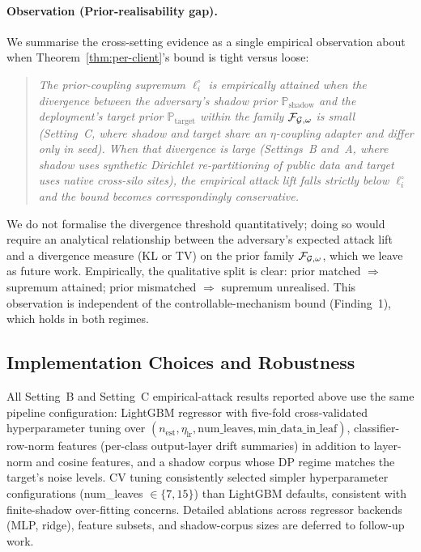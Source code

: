 \paragraph{Observation (Prior-realisability gap).}
We summarise the cross-setting evidence as a single empirical
observation about when Theorem~\ref{thm:per-client}'s bound is
tight versus loose:

\begin{quote}
\emph{The prior-coupling supremum $\ell_i^\circ$ is empirically
attained when the divergence between the adversary's shadow prior
$\mathbb{P}_{\mathrm{shadow}}$ and the deployment's target prior
$\mathbb{P}_{\mathrm{target}}$ within the family
$\mathcal{F}_{\mathcal{G},\omega}$ is small (Setting~C, where shadow and target
share an $\eta$-coupling adapter and differ only in seed). When that
divergence is large (Settings~B and~A, where shadow uses synthetic
Dirichlet re-partitioning of public data and target uses native
cross-silo sites), the empirical attack lift falls strictly below
$\ell_i^\circ$ and the bound becomes correspondingly conservative.}
\end{quote}

We do not formalise the divergence threshold quantitatively; doing so
would require an analytical relationship between the adversary's
expected attack lift and a divergence measure (KL or TV) on the
prior family $\mathcal{F}_{\mathcal{G},\omega}$, which we leave as future work.
Empirically, the qualitative split is clear: prior matched
$\Rightarrow$ supremum attained; prior mismatched
$\Rightarrow$ supremum unrealised. This observation is independent of
the controllable-mechanism bound (Finding~1), which holds in both
regimes.

\subsection{Implementation Choices and Robustness}
\label{sec:experiments-ablations}

All Setting~B and Setting~C empirical-attack results reported above
use the same \TADI pipeline configuration: LightGBM regressor with
five-fold cross-validated hyperparameter tuning over
$(n_{\text{est}}, \eta_{\text{lr}}, \text{num\_leaves}, \text{min\_data\_in\_leaf})$,
classifier-row-norm features (per-class output-layer drift summaries)
in addition to layer-norm and cosine features, and a shadow corpus
whose DP regime matches the target's noise levels. CV tuning
consistently selected simpler hyperparameter configurations
(num\_leaves $\in \{7,15\}$) than LightGBM defaults, consistent with
finite-shadow over-fitting concerns. Detailed ablations across
regressor backends (MLP, ridge), feature subsets, and shadow-corpus
sizes are deferred to follow-up work.
